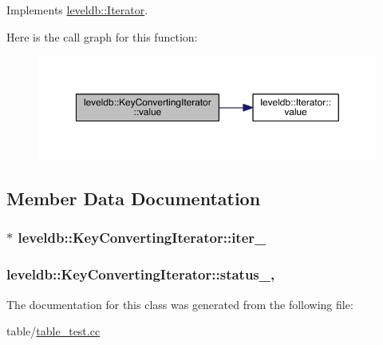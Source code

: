 Implements \hyperlink{classleveldb_1_1_iterator_a613ac2e965518aad7a064c64c72bcf7c}{leveldb\+::\+Iterator}.



Here is the call graph for this function\+:\nopagebreak
\begin{figure}[H]
\begin{center}
\leavevmode
\includegraphics[width=350pt]{classleveldb_1_1_key_converting_iterator_aa7a0281f93fbd520bf54d94bac77197a_cgraph}
\end{center}
\end{figure}




\subsection{Member Data Documentation}
\hypertarget{classleveldb_1_1_key_converting_iterator_a1aabeddf10287809ee449cbbe1422956}{}
\subsubsection[{iter\+\_\+}]{$\ast$ leveldb\+::\+Key\+Converting\+Iterator\+::iter\+\_\+\hspace{0.3cm}{\ttfamily [private]}}\label{classleveldb_1_1_key_converting_iterator_a1aabeddf10287809ee449cbbe1422956}
\hypertarget{classleveldb_1_1_key_converting_iterator_a0d1a57e8266f4f10b1ad730a98c39836}{}
\subsubsection[{status\+\_\+}]{ leveldb\+::\+Key\+Converting\+Iterator\+::status\+\_\+\hspace{0.3cm}{\ttfamily [mutable]}, {\ttfamily [private]}}\label{classleveldb_1_1_key_converting_iterator_a0d1a57e8266f4f10b1ad730a98c39836}


The documentation for this class was generated from the following file\+:\begin{DoxyCompactItemize}
\item 
table/\hyperlink{table__test_8cc}{table\+\_\+test.\+cc}\end{DoxyCompactItemize}
